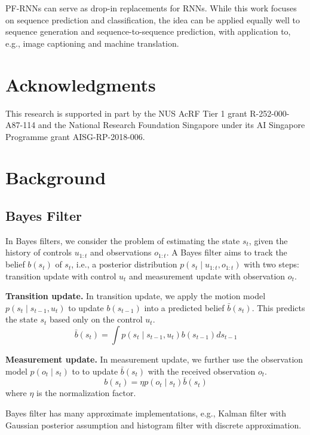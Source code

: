 \documentclass[letterpaper]{article} %
\begin{document}
PF-RNNs can serve as drop-in replacements for  RNNs.
While this work focuses on sequence prediction and classification, the idea can be applied equally well to sequence generation and sequence-to-sequence prediction, with application to, e.g., image captioning and machine translation.

\section*{Acknowledgments}
This research is supported in part by the NUS AcRF Tier 1 grant R-252-000-A87-114 and the National Research Foundation Singapore under its AI Singapore Programme grant AISG-RP-2018-006.




\appendix

\section{Background}\label{sec:background}
\subsection{Bayes Filter}
In Bayes filters, we consider the problem of estimating the state $s_t$, given the history of controls $u_{1:t}$ and observations $o_{1:t}$. A Bayes filter aims to track the belief $b(s_t)$ of $s_t$, i.e., a posterior distribution $p(s_t\mid u_{1:t}, o_{1:t})$ with two steps: transition update with control $u_t$ and measurement update with observation $o_t$. 

\textbf{Transition update.} In transition update, we apply the motion model $p(s_t\mid s_{t-1}, u_t)$ to update $b(s_{t-1})$ into a predicted belief $\bar{b}(s_t)$. This predicts the state $s_t$ based only on the control $u_t$. 
\begin{equation}
    \bar{b}(s_t) = \int p(s_t\mid s_{t-1}, u_t)b(s_{t-1})d s_{t-1}\label{eqn:bayes_trans}
\end{equation}

\textbf{Measurement update.} In measurement update, we further use the observation model $p(o_t\mid s_t)$ to to update $\bar{b}(s_t)$ with the received observation $o_t$. 
\begin{equation}
    b(s_t) = \eta p(o_t\mid s_t)\bar{b}(s_t)\label{eqn:bayes_obs}
\end{equation}
where $\eta$ is the normalization factor. 

Bayes filter has many approximate implementations, e.g., Kalman filter with Gaussian posterior assumption and histogram filter with discrete approximation.
\end{document}
